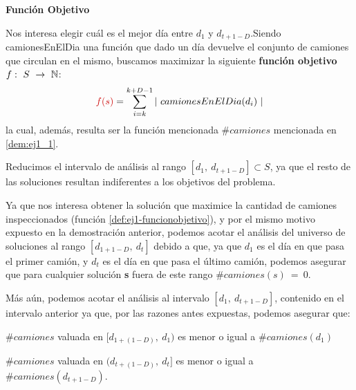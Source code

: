 \documentclass[11pt, a4paper, twoside]{article}
\begin{document}
\begin{definicion}\textbf{Función Objetivo}\label{def:ej1-funcionobjetivo}

Nos interesa elegir cuál es el mejor día entre $d_1$ y $d_{t+1-D}$.Siendo 
camionesEnElDia una función que dado un día devuelve el conjunto de
camiones que circulan en el mismo, buscamos maximizar la siguiente 
\textbf{función objetivo}\ $f:~S~\rightarrow~\mathbb{N}$:
\[
  \red{f(s)} = \sum_{i=k}^{k+D-1}{|~camionesEnElDia(d_{i})~|}
\]
la cual, además, resulta ser la función mencionada $\#camiones$ mencionada
en \ref{dem:ej1_1}.
\end{definicion}

\begin{proposicion}
Reducimos el intervalo de análisis al rango \textbf{$[d_{1},~d_{t+1-D}] \subset S$},
ya que el resto de las soluciones resultan indiferentes a los objetivos del problema.
\end{proposicion}
\begin{demostracion}
Ya que nos interesa obtener la solución que maximice la cantidad de camiones
inspeccionados (función \ref{def:ej1-funcionobjetivo}), y por el mismo motivo expuesto en la demostración anterior, 
podemos acotar el análisis del universo de soluciones al rango 
\textbf{$[d_{1+1-D},~d_{t}]$} debido a que, ya que \textbf{$d_{1}$} es el día en que 
pasa el primer camión, y \textbf{$d_{t}$} es el día en que pasa el último camión, 
podemos asegurar que para cualquier solución \textbf{s} fuera de este rango
\textbf{$\#camiones(s)~=~0$}. 

Más aún, podemos acotar el análisis al intervalo \textbf{$[d_{1},~d_{t+1-D}]$},
contenido en el intervalo anterior ya que, por las razones antes expuestas, 
podemos asegurar que: 
  
    $\#camiones$ valuada en {$[d_{1+(1-D)},~d_{1})$} es menor o igual
    a $\#camiones(d_{1})$
    
    $\#camiones$ valuada en {$(d_{t+(1-D)},~d_{t}]$} es menor o igual
    a $\#camiones(d_{t+1-D})$.
\end{demostracion}
\end{document}
